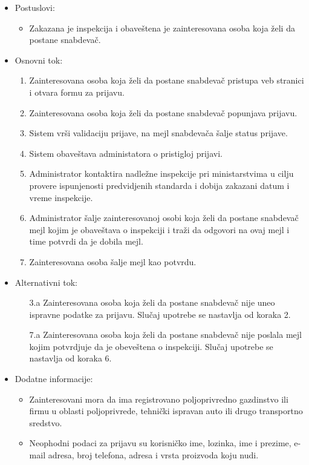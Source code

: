 \begin{itemize}
	\item Postuslovi:
		\begin{itemize}
					\item Zakazana je inspekcija i obaveštena je zainteresovana osoba koja želi da postane snabdevač.
		\end{itemize}		
	\item Osnovni tok:
		\begin{enumerate}
		    \item Zainteresovana osoba koja želi da postane snabdevač pristupa veb stranici i otvara formu za prijavu.
		    \item Zainteresovana osoba koja želi da postane snabdevač popunjava prijavu.
		    \item Sistem vrši validaciju prijave, na mejl snabdevača šalje status prijave.
		    \item Sistem obaveštava administatora o pristigloj prijavi.
		    \item Administrator kontaktira nadležne inspekcije pri ministarstvima u cilju provere ispunjenosti predvidjenih standarda i dobija zakazani datum i vreme inspekcije.
		    \item Administrator šalje zainteresovanoj osobi koja želi da postane snabdevač mejl kojim je obaveštava o inspekciji i traži da odgovori na ovaj mejl i time potvrdi da je dobila mejl.
		    \item Zainteresovana osoba šalje mejl kao potvrdu.
		\end{enumerate}
	\item Alternativni tok:
		\begin{itemize}
    		\item[3.a] Zainteresovana osoba koja želi da postane snabdevač nije uneo ispravne podatke za prijavu. Slučaj upotrebe se nastavlja od koraka 2.
		    \item[7.a] Zainteresovana osoba koja želi da postane snabdevač nije poslala mejl kojim potvrdjuje da je obeveštena o inspekciji. Slučaj upotrebe se nastavlja od koraka 6.
		\end{itemize} 
	\item Dodatne informacije:
		\begin{itemize}
		    \item Zainteresovani mora da ima registrovano poljoprivredno gazdinstvo ili firmu u oblasti poljoprivrede, tehnički ispravan auto ili drugo transportno sredstvo.
			\item Neophodni podaci za prijavu su korisničko ime, lozinka, ime i prezime, e-mail adresa, broj telefona, adresa i vrsta proizvoda koju nudi. 
		
		\end{itemize}
						
\end{itemize}